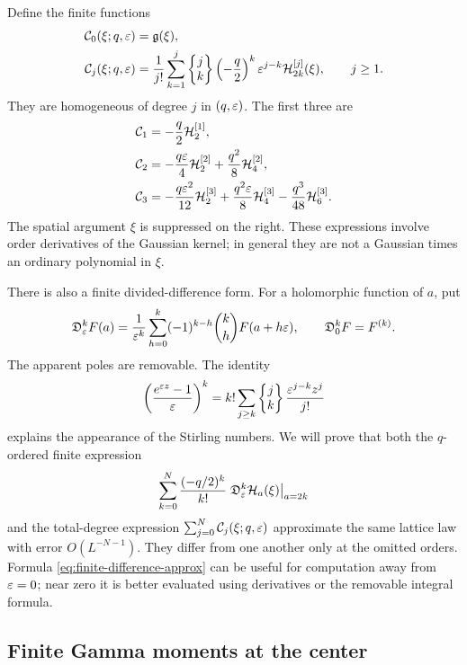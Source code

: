 Define the finite functions
\begin{align}
 \mathcal C_0(\xi;q,\varepsilon)&=\mathfrak g(\xi),\notag\\
 \mathcal C_j(\xi;q,\varepsilon)
 &=\frac1{j!}\sum_{k=1}^j
     \left\{\begin{matrix}j\\k\end{matrix}\right\}\left(-\frac q2\right)^k\varepsilon^{j-k}
           \mathcal H_{2k}^{[j]}(\xi),\qquad j\ge1.
           \label{eq:correction}
\end{align}
They are homogeneous of degree $j$ in $(q,\varepsilon)$. The first three are
\begin{align}
 \mathcal C_1&=-\frac q2\mathcal H_2^{[1]},\label{eq:C1}\\
 \mathcal C_2&=-\frac{q\varepsilon}{4}\mathcal H_2^{[2]}
                  +\frac{q^2}{8}\mathcal H_4^{[2]},\label{eq:C2}\\
 \mathcal C_3&=-\frac{q\varepsilon^2}{12}\mathcal H_2^{[3]}
             +\frac{q^2\varepsilon}{8}\mathcal H_4^{[3]}
             -\frac{q^3}{48}\mathcal H_6^{[3]}.
             \label{eq:C3}
\end{align}
The spatial argument $\xi$ is suppressed on the right. These expressions
involve order derivatives of the Gaussian kernel; in general they are
not a Gaussian times an ordinary polynomial in $\xi$.

There is also a finite divided-difference form. For a holomorphic
function of $a$, put
\begin{equation}\label{eq:divided-difference}
 \mathfrak D_\varepsilon^k F(a)
 =\frac1{\varepsilon^k}\sum_{h=0}^k(-1)^{k-h}\binom{k}{h}F(a+h\varepsilon),
 \qquad \mathfrak D_0^k F=F^{(k)}.
\end{equation}
The apparent poles are removable. The identity
\begin{equation}\label{eq:stirling-generating}
 \left(\frac{e^{\varepsilon z}-1}{\varepsilon}\right)^k
 =k!\sum_{j\ge k}\left\{\begin{matrix}j\\k\end{matrix}\right\}\frac{\varepsilon^{j-k}z^j}{j!}
\end{equation}
explains the appearance of the Stirling numbers. We will prove that
both the $q$-ordered finite expression
\begin{equation}\label{eq:finite-difference-approx}
 \sum_{k=0}^N\frac{(-q/2)^k}{k!}
       \left.\mathfrak D_\varepsilon^k\mathcal H_a(\xi)\right|_{a=2k}
\end{equation}
and the total-degree expression
$\sum_{j=0}^N\mathcal C_j(\xi;q,\varepsilon)$ approximate the same lattice
law with error $O(L^{-N-1})$. They differ from one another only at
the omitted orders. Formula \eqref{eq:finite-difference-approx}
can be useful for computation away from $\varepsilon=0$; near zero it is
better evaluated using derivatives or the removable integral formula.

\subsection{Finite Gamma moments at the center}

